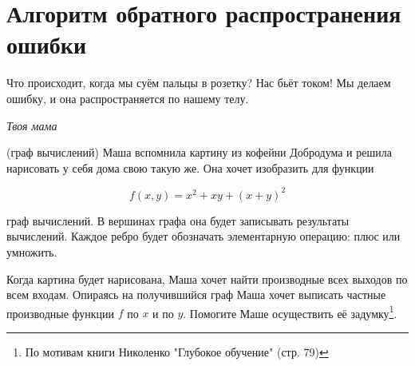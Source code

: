 
\section{Алгоритм обратного распространения ошибки}

\epigraph{Что происходит, когда мы суём пальцы в розетку? Нас бьёт током! Мы делаем ошибку, и она распространяется по нашему телу.}{\textit{Твоя мама}}


\begin{problem}{(граф вычислений)}
    Маша вспомнила картину из кофейни Добродума и решила нарисовать у себя дома свою такую же. Она хочет изобразить для функции  
    
    $$
    f(x,y) = x^2 + xy + (x + y)^2
    $$ 
    
    граф вычислений. В вершинах графа она будет записывать результаты вычислений. Каждое ребро будет обозначать элементарную операцию: плюс или умножить.
    
    Когда картина будет нарисована, Маша хочет найти производные всех выходов по всем входам. Опираясь на получившийся граф Маша хочет выписать частные производные функции $f$ по $x$ и по $y$. Помогите Маше осуществить её задумку\footnote{По мотивам книги Николенко "Глубокое обучение" (стр. 79)}.
\end{problem} 


